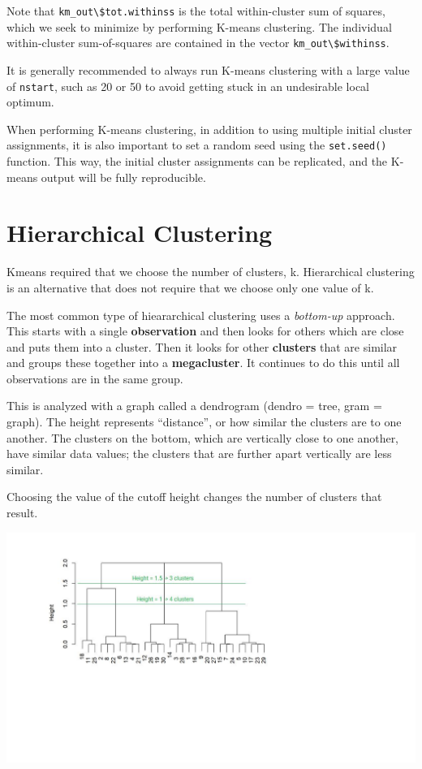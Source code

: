 \documentclass[
  openany]{book}
\begin{document}
Note that \texttt{km\_out\textbackslash{}\$tot.withinss} is the total within-cluster sum of squares,
which we seek to minimize by performing K-means clustering. The individual within-cluster sum-of-squares are contained in the
vector \texttt{km\_out\textbackslash{}\$withinss}.

It is generally recommended to always run K-means clustering with a large
value of \texttt{nstart}, such as 20 or 50 to avoid getting stuck in an undesirable local
optimum.

When performing K-means clustering, in addition to using multiple initial
cluster assignments, it is also important to set a random seed using the
\texttt{set.seed()} function. This way, the initial cluster assignments can
be replicated, and the K-means output will be fully reproducible.

\hypertarget{hierarchical-clustering}{%
\section{Hierarchical Clustering}\label{hierarchical-clustering}}

Kmeans required that we choose the number of clusters, k. Hierarchical clustering is an alternative that does not require that we choose only one value of k.

The most common type of hieararchical clustering uses a \emph{bottom-up} approach. This starts with a single \textbf{observation} and then looks for others which are close and puts them into a cluster. Then it looks for other \textbf{clusters} that are similar and groups these together into a \textbf{megacluster}. It continues to do this until all observations are in the same group.

This is analyzed with a graph called a dendrogram (dendro = tree, gram = graph). The height represents ``distance'', or how similar the clusters are to one another. The clusters on the bottom, which are vertically close to one another, have similar data values; the clusters that are further apart vertically are less similar.

Choosing the value of the cutoff height changes the number of clusters that result.

\begin{center}\includegraphics[width=10\linewidth]{images/HClustering} \end{center}
\end{document}
